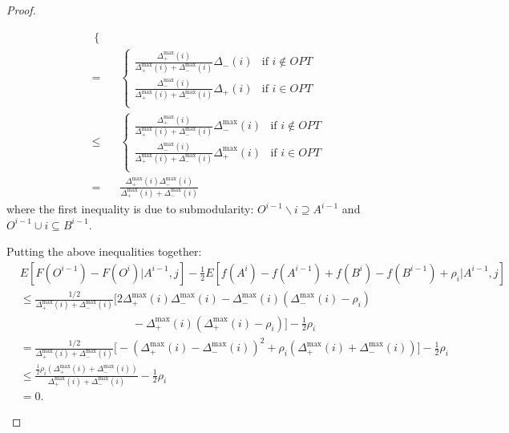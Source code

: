 \begin{proof}
\begin{description}
\begin{align*}
\begin{cases}
\end{cases}\\
=&\begin{cases}
    \frac{\Delta_+^{\max}(i)}{\Delta_+^{\max}(i) + \Delta_-^{\max}(i)} \Delta_-(i) & \text{if $i\not\in OPT$}\\
    \frac{\Delta_-^{\max}(i)}{\Delta_+^{\max}(i) + \Delta_-^{\max}(i)} \Delta_+(i) & \text{if $i    \in OPT$}\\
\end{cases}\\
\leq&\begin{cases}
    \frac{\Delta_+^{\max}(i)}{\Delta_+^{\max}(i) + \Delta_-^{\max}(i)} \Delta_-^{\max}(i) & \text{if $i\not\in OPT$}\\
    \frac{\Delta_-^{\max}(i)}{\Delta_+^{\max}(i) + \Delta_-^{\max}(i)} \Delta_+^{\max}(i) & \text{if $i    \in OPT$}\\
\end{cases}\\
=& \frac{\Delta_+^{\max}(i)\Delta_-^{\max}(i)}{\Delta_+^{\max}(i) + \Delta_-^{\max}(i)}
\end{align*}
where the first inequality is due to submodularity: $O^{i-1}\backslash i \supseteq A^{i-1}$ and $O^{i-1}\cup i \subseteq B^{i-1}$.

Putting the above inequalities together:
\begin{align*}
&E[F(O^{i-1}) - F(O^i) | A^{i-1}, j] - \frac{1}{2} E[f(A^i) - f(A^{i-1}) + f(B^i) - f(B^{i-1}) + \rho_i  | A^{i-1}, j]\\
&\leq \frac{1/2}{\Delta_+^{\max}(i) + \Delta_-^{\max}(i)}\bigg[
2\Delta_+^{\max}(i)\Delta_-^{\max}(i)
- \Delta_-^{\max}(i)(\Delta_-^{\max}(i) - \rho_i)\\
&\quad\quad\quad\quad\quad\quad\quad\quad\quad\quad- \Delta_+^{\max}(i)(\Delta_+^{\max}(i) - \rho_i)
\bigg]- \frac{1}{2}\rho_i\\
&= \frac{1/2}{\Delta_+^{\max}(i) + \Delta_-^{\max}(i)}\bigg[-(\Delta_+^{\max}(i) - \Delta_-^{\max}(i))^2 + \rho_i(\Delta_+^{\max}(i) + \Delta_-^{\max}(i))\bigg] - \frac{1}{2}\rho_i\\
&\leq \frac{\frac{1}{2}\rho_i(\Delta_+^{\max}(i) + \Delta_-^{\max}(i))}{\Delta_+^{\max}(i) + \Delta_-^{\max}(i)} - \frac{1}{2}\rho_i\\
&= 0.
\end{align*}


\end{description}
\end{proof}
